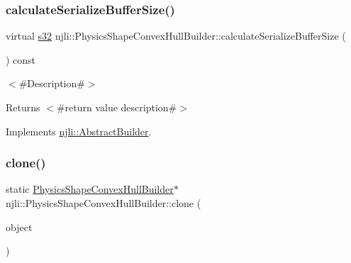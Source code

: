 \mbox{\label{classnjli_1_1_physics_shape_convex_hull_builder_a96ace17c99a343b123555173e1150316}} 
\subsubsection{\texorpdfstring{calculate\+Serialize\+Buffer\+Size()}{calculateSerializeBufferSize()}}
{\footnotesize\ttfamily virtual \mbox{\hyperlink{_util_8h_aa62c75d314a0d1f37f79c4b73b2292e2}{s32}} njli\+::\+Physics\+Shape\+Convex\+Hull\+Builder\+::calculate\+Serialize\+Buffer\+Size (\begin{DoxyParamCaption}{ }\end{DoxyParamCaption}) const\hspace{0.3cm}{\ttfamily [virtual]}}

$<$\#\+Description\#$>$

\begin{DoxyReturn}{Returns}
$<$\#return value description\#$>$ 
\end{DoxyReturn}


Implements \mbox{\hyperlink{classnjli_1_1_abstract_builder_aa1d220053e182c37b31b427499c6eacf}{njli\+::\+Abstract\+Builder}}.

\mbox{\label{classnjli_1_1_physics_shape_convex_hull_builder_a575339a2be728a169b8eb6ec2aa15255}} 
\subsubsection{\texorpdfstring{clone()}{clone()}}
{\footnotesize\ttfamily static \mbox{\hyperlink{classnjli_1_1_physics_shape_convex_hull_builder}{Physics\+Shape\+Convex\+Hull\+Builder}}$\ast$ njli\+::\+Physics\+Shape\+Convex\+Hull\+Builder\+::clone (\begin{DoxyParamCaption}\item[{const \mbox{\hyperlink{classnjli_1_1_physics_shape_convex_hull_builder}{Physics\+Shape\+Convex\+Hull\+Builder}} \&}]{object }\end{DoxyParamCaption})\hspace{0.3cm}{\ttfamily [static]}}

